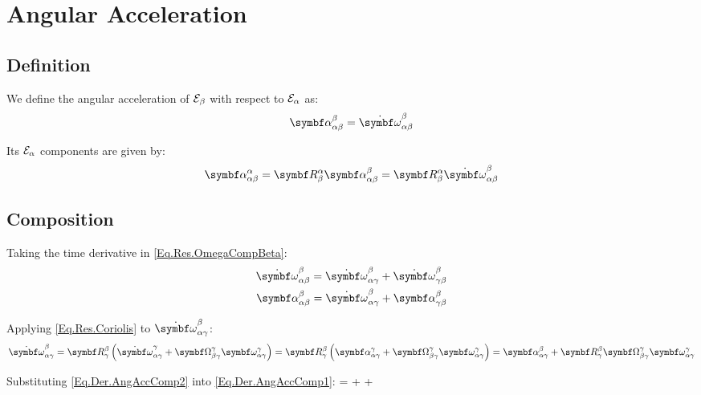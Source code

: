 \section{Angular Acceleration}
\subsection{Definition}
We define the angular acceleration of $\basis[\beta]$ with respect to $\basis[\alpha]$ as:
\begin{equation} \label{Eq.Def.AngVel.AngAccelBeta}
\angacc{\alpha}{\beta}{\beta} = \vrelprjdot{\angvelsymb}{\alpha}{\beta}{\beta}
\end{equation}

Its $\basis[\alpha]$ components are given by:
\begin{equation} \label{Eq.Def.AngVel.AngAccelAlpha}
\angacc{\alpha}{\beta}{\alpha} = \RotM{\alpha}{\beta} \angacc{\alpha}{\beta}{\beta}  = \RotM{\alpha}{\beta} \vrelprjdot{\angvelsymb}{\alpha}{\beta}{\beta}
\end{equation}

\subsection{Composition}
Taking the time derivative in \eqref{Eq.Res.OmegaCompBeta}:
\begin{equation} \label{Eq.Der.AngAccComp1}
\begin{aligned}
\angveldot{\alpha}{\beta}{\beta} = \angveldot{\alpha}{\gamma}{\beta} + \angveldot{\gamma}{\beta}{\beta} \\
\angacc{\alpha}{\beta}{\beta} = \angveldot{\alpha}{\gamma}{\beta} + \angacc{\gamma}{\beta}{\beta}
\end{aligned}
\end{equation}

Applying \eqref{Eq.Res.Coriolis} to $\angveldot{\alpha}{\gamma}{\beta}$:
\begin{multline} \label{Eq.Der.AngAccComp2}
\angveldot{\alpha}{\gamma}{\beta} = \RotM{\beta}{\gamma} \rndp{\angveldot{\alpha}{\gamma}{\gamma} + \AngVelSkew{\beta}{\gamma}{\gamma} \angvel{\alpha}{\gamma}{\gamma}} =
\RotM{\beta}{\gamma} \rndp{\angacc{\alpha}{\gamma}{\gamma} + \AngVelSkew{\beta}{\gamma}{\gamma} \angvel{\alpha}{\gamma}{\gamma}} = 
\angacc{\alpha}{\gamma}{\beta} + \RotM{\beta}{\gamma} \AngVelSkew{\beta}{\gamma}{\gamma} \angvel{\alpha}{\gamma}{\gamma}
\end{multline}

Substituting \eqref{Eq.Der.AngAccComp2} into \eqref{Eq.Der.AngAccComp1}:
{
\angacc{\alpha}{\beta}{\beta} =\angacc{\alpha}{\gamma}{\beta}  + \angacc{\gamma}{\beta}{\beta} + \RotM{\beta}{\gamma} \AngVelSkew{\beta}{\gamma}{\gamma} \angvel{\alpha}{\gamma}{\gamma}
}

